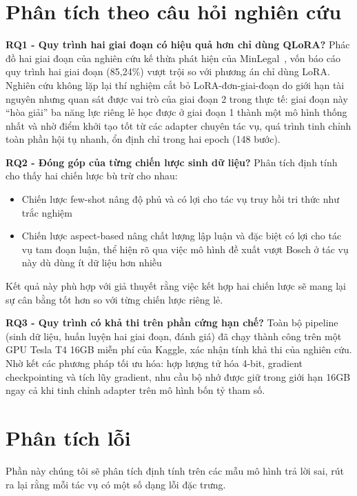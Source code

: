 \section{Phân tích theo câu hỏi nghiên cứu}

\textbf{RQ1 - Quy trình hai giai đoạn có hiệu quả hơn chỉ dùng QLoRA?} Phác đồ hai giai đoạn của nghiên cứu kế thừa phát hiện của MinLegal~\cite{luan2025minlegal}, vốn báo cáo quy trình hai giai đoạn (85,24\%) vượt trội so với phương án chỉ dùng LoRA. Nghiên cứu không lặp lại thí nghiệm cắt bỏ LoRA-đơn-giai-đoạn do giới hạn tài nguyên nhưng quan sát được vai trò của giai đoạn 2 trong thực tế: giai đoạn này ``hòa giải'' ba năng lực riêng lẻ học được ở giai đoạn 1 thành một mô hình thống nhất và nhờ điểm khởi tạo tốt từ các adapter chuyên tác vụ, quá trình tinh chỉnh toàn phần hội tụ nhanh, ổn định chỉ trong hai epoch (148 bước).

\textbf{RQ2 - Đóng góp của từng chiến lược sinh dữ liệu?} Phân tích định tính cho thấy hai chiến lược bù trừ cho nhau:
\begin{itemize}
    \item Chiến lược few-shot nâng độ phủ và có lợi cho tác vụ truy hồi tri thức như trắc nghiệm
    \item Chiến lược aspect-based nâng chất lượng lập luận và đặc biệt có lợi cho tác vụ tam đoạn luận, thể hiện rõ qua việc mô hình đề xuất vượt Bosch ở tác vụ này dù dùng ít dữ liệu hơn nhiều
\end{itemize}

Kết quả này phù hợp với giả thuyết rằng việc kết hợp hai chiến lược sẽ mang lại sự cân bằng tốt hơn so với từng chiến lược riêng lẻ.

\textbf{RQ3 - Quy trình có khả thi trên phần cứng hạn chế?} Toàn bộ pipeline (sinh dữ liệu, huấn luyện hai giai đoạn, đánh giá) đã chạy thành công trên một GPU Tesla T4 16GB miễn phí của Kaggle, xác nhận tính khả thi của nghiên cứu. Nhờ kết các phương pháp tối ưu hóa: hợp lượng tử hóa 4-bit, gradient checkpointing và tích lũy gradient, nhu cầu bộ nhớ được giữ trong giới hạn 16GB ngay cả khi tinh chỉnh adapter trên mô hình bốn tỷ tham số.

\section{Phân tích lỗi}

Phần này chúng tôi sẽ phân tích định tính trên các mẫu mô hình trả lời sai, rút ra lại rằng mỗi tác vụ có một số dạng lỗi đặc trưng.

